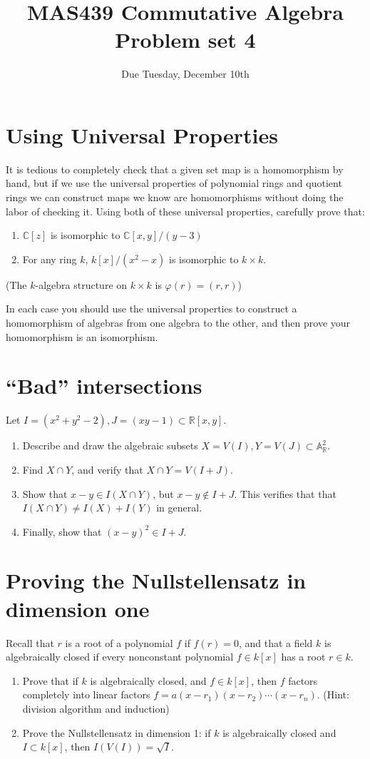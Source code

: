 \documentclass{amsart}[12pt]
\title{MAS439 Commutative Algebra \\ Problem set 4}
\author{Due Tuesday, December 10th}
\begin{document}
\maketitle


\section{Using Universal Properties}

It is tedious to completely check that a given set map is a homomorphism by hand, but if we use the universal properties of polynomial rings and quotient rings we can construct maps we know are homomorphisms without doing the labor of checking it.  Using both of these universal properties, carefully prove that:

\begin{enumerate}
 \item $\mathbb{C}[z]$ is isomorphic to $\mathbb{C}[x,y]/(y-3)$
\item For any ring $k$, $k[x]/(x^2-x)$ is isomorphic to $k\times k$.
\end{enumerate}
(The $k$-algebra structure on $k\times k$ is $\varphi(r)=(r,r)$)

In each case you should use the universal properties to construct a homomorphism of algebras from one algebra to the other, and then prove your homomorphism is an isomorphism.

\section{``Bad'' intersections}

Let $I=(x^2+y^2-2), J=(xy-1)\subset \mathbb{R}[x,y].$

\begin{enumerate}
  \item Describe and draw the algebraic subsets $X=V(I), Y=V(J)\subset\mathbb{A}_\mathbb{R}^2$.
\item Find $X\cap Y$, and verify that $X\cap Y=V(I+J)$.  
\item Show that $x-y\in I(X\cap Y)$, but $x-y\notin I + J$.  This verifies that that $I(X\cap Y)\neq I(X)+I(Y)$ in general.
\item Finally, show that $(x-y)^2\in I+J$.  
\end{enumerate}
\section{Proving the Nullstellensatz in dimension one}
Recall that $r$ is a root of a polynomial $f$ if $f(r)=0$, and that a field $k$ is algebraically closed if every nonconstant polynomial $f\in k[x]$ has a root $r\in k$.

\begin{enumerate}
\item Prove that if $k$ is algebraically closed, and $f\in k[x]$, then $f$ factors completely into linear factors $f=a(x-r_1)(x-r_2)\cdots(x-r_n)$.  (Hint: division algorithm and induction)
\item Prove the Nullstellensatz in dimension 1: if $k$ is algebraically closed and $I\subset k[x]$, then $I(V(I))=\sqrt{I}$.
\end{enumerate}
\end{document}
